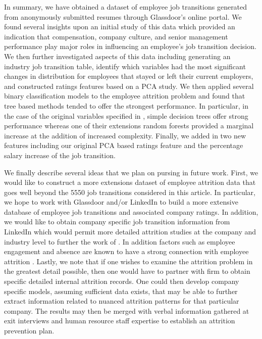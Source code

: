 \documentclass[10pt]{article}
\begin{document}
In summary, we have obtained a dataset of employee job transitions generated from 
anonymously submitted resumes through Glassdoor's online portal. We found several 
insights upon an initial study of this data which provided an indication that 
compensation, company culture, and senior management performance play major 
roles in influencing an employee's job transition decision.  We then further investigated 
aspects of this data including generating an industry job transition table, identify 
which variables had the most significant changes in distribution for employees 
that stayed or left their current employers, and constructed ratings features 
based on a PCA study. We then applied several binary classification models 
to the employee attrition problem and found that tree based methods tended to 
offer the strongest performance.  In particular, in the case of the original 
variables specified in \cite{Smart2016}, simple decision trees offer strong 
performance whereas one of their extensions random forests provided a 
marginal increase at the addition of increased complexity.  Finally, we added 
in two new features including our original PCA based ratings feature
and the percentage salary increase of the job transition.  

We finally describe several ideas that we plan on pursing in future work.  First, 
we would like to construct a more extensions dataset of employee attrition data that goes
well beyond the 5550 job transitions considered in this article.  In particular, 
we hope to work with Glassdoor and/or LinkedIn to build a more extensive database of 
employee job transitions and associated company ratings. In addition, we would like to 
obtain company specific job transition information from LinkedIn which would permit 
more detailed attrition studies at the company and industry level to further 
the work of \cite{Bennet1993}.  In addition factors such as employee 
engagement and absence are known to have a strong connection with employee attrition 
\cite{Kumar2015,Mitra1992}.  Lastly, we 
note that if one wishes to examine the attrition problem in the greatest detail 
possible, then one would have to partner with firm to obtain specific detailed 
internal attrition records.  One could then develop company specific models, 
assuming sufficient data exists, that may be able to further extract information 
related to nuanced attrition patterns for that particular company.  The results 
may then be merged with verbal information gathered at exit interviews and 
human resource staff expertise to establish an attrition prevention plan. 
\end{document}
